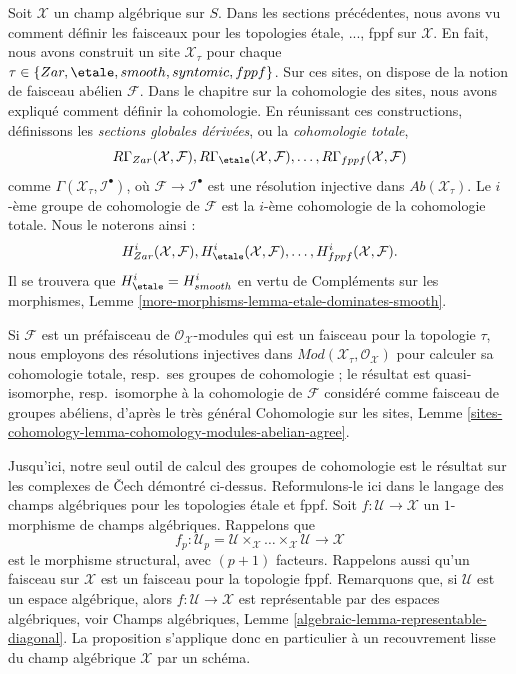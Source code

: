 \noindent
Soit $\mathcal{X}$ un champ algébrique sur $S$. Dans les sections précédentes,
nous avons vu comment définir les faisceaux pour les topologies \'etale, ..., fppf
sur $\mathcal{X}$. En fait, nous avons construit un site
$\mathcal{X}_\tau$ pour chaque $\tau \in \{Zar, \etale, smooth, syntomic,
fppf\}$. Sur ces sites, on dispose de la notion de faisceau abélien $\mathcal{F}$.
Dans le chapitre sur la cohomologie des sites, nous avons expliqué comment définir la
cohomologie. En réunissant ces constructions, définissons les
{\it sections globales dérivées}, ou la {\it cohomologie totale},
$$
R\Gamma_{Zar}(\mathcal{X}, \mathcal{F}),
R\Gamma_\etale(\mathcal{X}, \mathcal{F}), \ldots,
R\Gamma_{fppf}(\mathcal{X}, \mathcal{F})
$$
comme $\Gamma(\mathcal{X}_\tau, \mathcal{I}^\bullet)$, où
$\mathcal{F} \to \mathcal{I}^\bullet$ est une résolution injective
dans $\textit{Ab}(\mathcal{X}_\tau)$. Le $i$-ème groupe de cohomologie de $\mathcal{F}$
est la $i$-ème cohomologie de la cohomologie totale. Nous le noterons
ainsi :
$$
H^i_{Zar}(\mathcal{X}, \mathcal{F}),
H^i_\etale(\mathcal{X}, \mathcal{F}), \ldots,
H^i_{fppf}(\mathcal{X}, \mathcal{F}).
$$
Il se trouvera que $H^i_\etale = H^i_{smooth}$ en vertu de
Compléments sur les morphismes, Lemme \ref{more-morphisms-lemma-etale-dominates-smooth}.

\medskip\noindent
Si $\mathcal{F}$ est un préfaisceau de $\mathcal{O}_\mathcal{X}$-modules
qui est un faisceau pour la topologie $\tau$, nous employons des résolutions
injectives dans $\textit{Mod}(\mathcal{X}_\tau, \mathcal{O}_\mathcal{X})$
pour calculer sa cohomologie totale, resp.\ ses groupes de cohomologie ;
le résultat est quasi-isomorphe, resp.\ isomorphe à la cohomologie de
$\mathcal{F}$ considéré comme faisceau de groupes abéliens, d'après le très général
Cohomologie sur les sites, Lemme
\ref{sites-cohomology-lemma-cohomology-modules-abelian-agree}.

\medskip\noindent
Jusqu'ici, notre seul outil de calcul des groupes de cohomologie est le résultat sur les
complexes de {\v C}ech démontré ci-dessus. Reformulons-le ici dans le langage
des champs algébriques pour les topologies \'etale et fppf. Soit
$f : \mathcal{U} \to \mathcal{X}$ un $1$-morphisme de champs algébriques.
Rappelons que
$$
f_p : \mathcal{U}_p =
\mathcal{U} \times_\mathcal{X} \ldots \times_\mathcal{X} \mathcal{U}
\longrightarrow
\mathcal{X}
$$
est le morphisme structural, avec $(p + 1)$ facteurs. Rappelons aussi
qu'un faisceau sur $\mathcal{X}$ est un faisceau pour la topologie fppf. Remarquons
que, si $\mathcal{U}$ est un espace algébrique, alors
$f : \mathcal{U} \to \mathcal{X}$ est représentable par des espaces algébriques,
voir
Champs algébriques, Lemme \ref{algebraic-lemma-representable-diagonal}.
La proposition s'applique donc en particulier à un recouvrement lisse du
champ algébrique $\mathcal{X}$ par un schéma.

